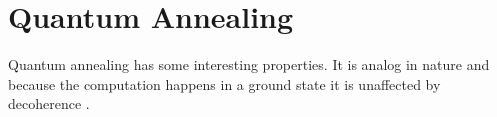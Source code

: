 \section{Quantum Annealing}
Quantum annealing has some interesting properties. It is analog in nature and because the computation happens in a ground state it is unaffected by decoherence \citep{McGeoch}. 
\cite{McGeoch}